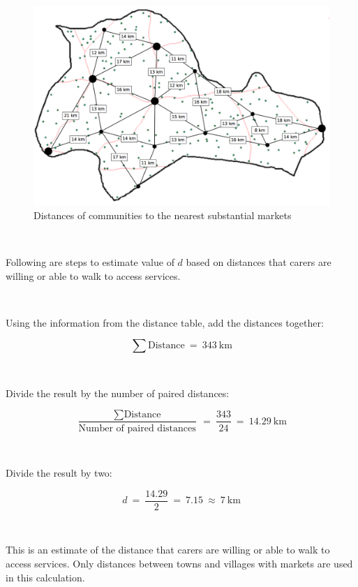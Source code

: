 \documentclass[12pt,a4paper]{book}
\theoremstyle{definition}
\theoremstyle{definition}
\theoremstyle{definition}
\theoremstyle{remark}
\let\BeginKnitrBlock\begin \let\EndKnitrBlock\end
\begin{document}
~

\begin{figure}[H]

{\centering \includegraphics[width=16.67in]{figures/step2a} 

}

\caption{Distances of communities to the nearest substantial markets}\label{fig:distance2}
\end{figure}

~

\BeginKnitrBlock{rmdcalc}
Following are steps to estimate value of \(d\) based on distances that
carers are willing or able to walk to access services.

~

Using the information from the distance table, add the distances
together:

\[ \sum \text{Distance} ~ = ~ 343 ~ \text{km} \]

~

Divide the result by the number of paired distances:

\[ \frac{\sum \text{Distance}}{\text{Number of paired distances}} ~ = ~ \frac{343}{24} ~ = ~ 14.29 ~ \text{km} \]

~

Divide the result by two:

\[ d ~ = ~ \frac{14.29}{2} ~ = ~ 7.15 ~ \approx ~ 7 ~ \text{km} \]
\EndKnitrBlock{rmdcalc}

~

This is an estimate of the distance that carers are willing or able to
walk to access services. Only distances between towns and villages with
markets are used in this calculation.
\end{document}
